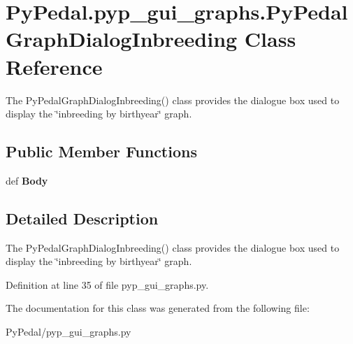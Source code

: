 \hypertarget{classPyPedal_1_1pyp__gui__graphs_1_1PyPedalGraphDialogInbreeding}{
\section{PyPedal.pyp\_\-gui\_\-graphs.PyPedalGraphDialogInbreeding Class Reference}
\label{classPyPedal_1_1pyp__gui__graphs_1_1PyPedalGraphDialogInbreeding}
}


The PyPedalGraphDialogInbreeding() class provides the dialogue box used to display the \char`\"{}inbreeding by birthyear\char`\"{} graph.  


\subsection*{Public Member Functions}
\begin{DoxyCompactItemize}
\item 
\hypertarget{classPyPedal_1_1pyp__gui__graphs_1_1PyPedalGraphDialogInbreeding_a1375101a93d8a11235ff301914542a52}{
def {\bfseries Body}}
\label{classPyPedal_1_1pyp__gui__graphs_1_1PyPedalGraphDialogInbreeding_a1375101a93d8a11235ff301914542a52}

\end{DoxyCompactItemize}


\subsection{Detailed Description}
The PyPedalGraphDialogInbreeding() class provides the dialogue box used to display the \char`\"{}inbreeding by birthyear\char`\"{} graph. 

Definition at line 35 of file pyp\_\-gui\_\-graphs.py.



The documentation for this class was generated from the following file:\begin{DoxyCompactItemize}
\item 
PyPedal/pyp\_\-gui\_\-graphs.py\end{DoxyCompactItemize}
